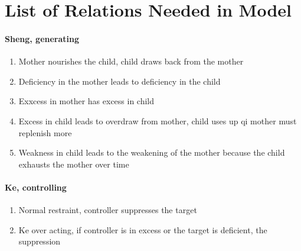 \documentclass{article}
\newcommand{\ignore}[1]{}
\begin{document}
\ignore{
\begin{equation}
\begin{array}{rl}
\dot{x_1} &= (b_1 + g_1 x_5 -a_1 x_1)x_1 - k_1 x_4 \\
\dot{x_2} &= (b_2 + g_2 x_1 -a_2 x_2)x_2 - k_2 x_5 \\
\dot{x_3} &= g_3 x_2 - k_3 x_1 \\
\dot{x_4} &= g_4 x_3 - k_4 x_2 \\
\dot{x_5} &= g_5 x_4  - k_5 x_3  - c_5 (1+\frac{x_1}{h_1}) x_5
\end{array}
\end{equation}
}


\section{List of Relations Needed in Model}

\paragraph{Sheng, generating}
\begin{enumerate}
    \item Mother nourishes the child, child draws back from the mother
    \item Deficiency in the mother leads to deficiency in the child
    \item Exxcess in mother has excess in child
    \item Excess in child leads to overdraw from mother, child uses up qi mother must replenish more
    \item Weakness in child leads to the weakening of the mother because the child exhausts the mother over time
\end{enumerate}

\paragraph{Ke, controlling}
\begin{enumerate}
    \item Normal restraint, controller suppresses the target
    \item Ke over acting, if controller is in excess or the target is deficient, the suppression
\end{enumerate}




































\printbibliography
\end{document}
